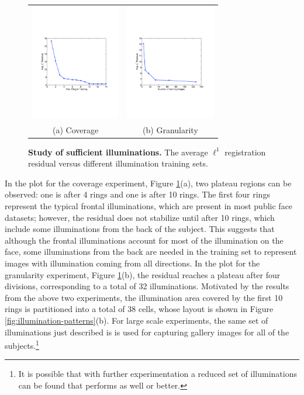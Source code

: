 \begin{figure}
\centering
\begin{tabular}{@{}c@{}c@{}}
\includegraphics[height=2in]{figures_pami/illum_results/coverage_sunset.pdf} &
\includegraphics[height=2in]{figures_pami/illum_results/granularity_sunset.pdf} \\
(a) Coverage & (b) Granularity
\end{tabular}
\caption{\small{\bf Study of sufficient illuminations.} The average $\ell^1$
registration residual versus different illumination training sets. }
\label{fig:illumination-sufficiency}
\end{figure}

In the plot for the coverage experiment, Figure
\ref{fig:illumination-sufficiency}(a), two plateau regions can be observed: one
is after 4 rings and one is after 10 rings. The first four rings represent the
typical frontal illuminations, which are present in most public face datasets;
however, the residual does not stabilize until after 10 rings, which include
some illuminations from the back of the subject. This suggests that although
the frontal illuminations account for most of the illumination on the face,
some illuminations from the back are needed in the training set to represent
images with illumination coming from all directions.  In the plot for the
granularity experiment, Figure \ref{fig:illumination-sufficiency}(b), the
residual reaches a plateau after four divisions, corresponding to a total of 32
illuminations. Motivated by the results from the above two experiments, the
illumination area covered by the first 10 rings is partitioned into a total of
38 cells, whose layout is shown in Figure \ref{fig:illumination-patterns}(b).
For large scale experiments, the same set of illuminations just described is is
used for capturing gallery images for all of the subjects.\footnote{It is
possible that with further experimentation a reduced set of illuminations can
be found that performs as well or better.}

